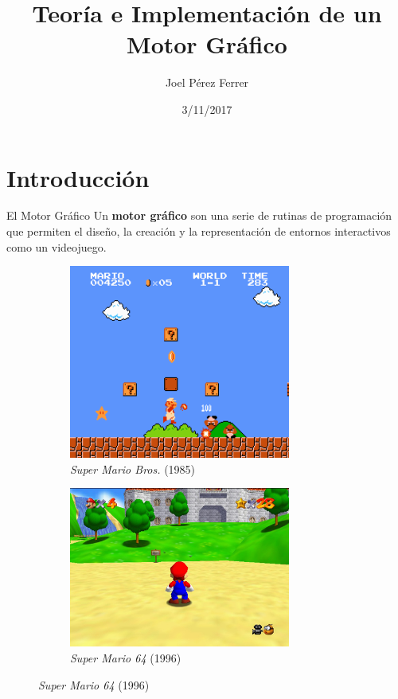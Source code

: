 \documentclass{beamer}
\title[T. e I. de un Motor Gráfico]{Teoría e Implementación de un Motor Gráfico}
\author{Joel Pérez Ferrer}
\institute{Institut de Bruguers}
\date{3/11/2017}
\begin{document}
\begin{frame}
  \titlepage
\end{frame}

\section{Introducción}
\begin{frame}{El Motor Gráfico}
  Un \textbf{motor gráfico} son una serie de rutinas de programación que permiten el diseño, la creación y la representación de entornos interactivos como un videojuego.
  
\begin{figure} [h]
  \centering
  \captionsetup[subfigure]{justification=centering}
  \begin{subfigure}{0.4\textwidth}
    \centering
    \includegraphics[width=0.8\textwidth]{img/supermario} 
    \caption{\textit{Super Mario Bros.} (1985)}
  \end{subfigure}
  \begin{subfigure}{0.4\textwidth}
    \centering
    \includegraphics[width=0.8\textwidth]{img/mario64} 
    \caption{\textit{Super Mario 64} (1996)}
  \end{subfigure}
\end{figure}
\end{frame}
\end{document}
